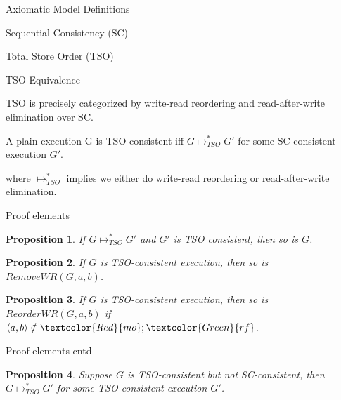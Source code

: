 \documentclass[xcolor={dvipsnames}, notes]{beamer}
\newtheorem{prop}{Proposition}
\newcommand{\rf}{\textcolor{Green}{rf}}
\newcommand{\mo}{\textcolor{Red}{mo}}
\begin{document}
    \begin{frame}{Axiomatic Model Definitions}


    \end{frame}

    \begin{frame}{Sequential Consistency (SC)}

    \end{frame}

    \begin{frame}{Total Store Order (TSO)}

    \end{frame}

    \begin{frame}{TSO Equivalence}

        TSO is precisely categorized by write-read reordering and read-after-write elimination over SC. 
        \begin{theorem}
            A plain execution G is TSO-consistent iff $G \longmapsto^{*}_{TSO} G'$ for some SC-consistent execution $G'$.
        \end{theorem}
        where $\longmapsto^{*}_{TSO}$ implies we either do write-read reordering or read-after-write elimination.
    
    \end{frame}

    \begin{frame}{Proof elements}

        \begin{prop}
            If $G \longmapsto^{*}_{TSO} G'$ and $G'$ is TSO consistent, then so is $G$.
        \end{prop}

        \begin{prop}
            If $G$ is TSO-consistent execution, then so is $RemoveWR(G,a,b)$.
        \end{prop}

        \begin{prop}
            If $G$ is TSO-consistent execution, then so is $ReorderWR(G,a,b)$ if $\langle a,b \rangle \notin \mo;\rf$.
        \end{prop}

    \end{frame}

    \begin{frame}{Proof elements cntd}
        \begin{prop}
            Suppose $G$ is TSO-consistent but not SC-consistent, then $G \longmapsto^{*}_{TSO} G'$ for some TSO-consistent execution $G'$.   
        \end{prop}
    \end{frame}
\end{document}
